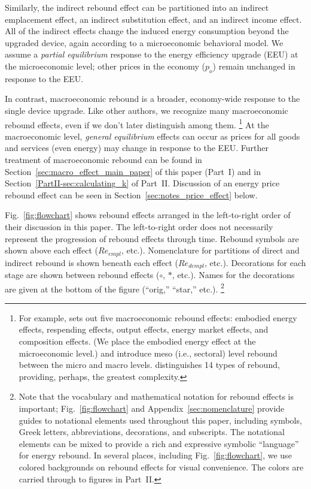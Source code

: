 \documentclass[12pt]{article}\usepackage[]{graphicx}\usepackage[]{xcolor}
\begin{document}
Similarly, the indirect rebound effect can be partitioned into
an indirect emplacement effect, 
an indirect substitution effect, and
an indirect income effect. 
All of the indirect effects
change the induced energy consumption
beyond the upgraded device, 
again according to a microeconomic behavioral model.
We assume a \emph{partial equilibrium} response to the 
energy efficiency upgrade (EEU)
at the microeconomic level;
other prices in the economy ($p_o$) remain unchanged
in response to the EEU.

In contrast, 
macroeconomic rebound is a broader, economy-wide response 
to the single device upgrade. 
Like other authors, we recognize many macroeconomic rebound effects, 
even if we don't later distinguish among them.%
\footnote{
  For example, \citet{Sorrell:2009cg} 
  sets out five macroeconomic rebound effects:
  embodied energy effects, respending effects, output effects, 
  energy market effects, and composition effects.
  (We place the embodied energy effect at the microeconomic level.)
  \citet{Santarius2016} and \citet{Lange2021} 
  introduce 
  meso (i.e., sectoral) level rebound
  between the micro and macro levels.
  \citet{VandenBergh2011} distinguishes 14 types of rebound, 
  providing, perhaps, the greatest complexity.   
}
%
At the macroeconomic level, \emph{general equilibrium} effects
can occur as prices for all goods and services (even energy)
may change in response to the EEU.
Further treatment of macroeconomic rebound
can be found 
in Section~\ref{sec:macro_effect_main_paper} of this paper (Part~I) and 
in Section~\ref{PartII-sec:calculating_k} of Part~II.
Discussion of an energy price rebound effect 
can be seen in Section~\ref{sec:notes_price_effect} below.

Fig.~\ref{fig:flowchart} shows rebound effects
arranged in the left-to-right order of their discussion in this paper.
The left-to-right order does not necessarily represent 
the progression of rebound effects through time.
Rebound symbols are shown above each effect ($Re_{empl}$, etc.).
Nomenclature for partitions of direct and indirect rebound 
is shown beneath each effect ($Re_{dempl}$, etc.).
Decorations for each stage are shown between rebound effects
($\circ$, $*$, etc.).
Names for the decorations are given at the bottom of the figure
(``orig,'' ``star,'' etc.).%
\footnote{
  Note that
  the vocabulary and mathematical notation for rebound effects is important;
  Fig.~\ref{fig:flowchart} and Appendix~\ref{sec:nomenclature} provide guides to 
  notational elements used throughout this paper, including
  symbols, Greek letters, abbreviations, decorations, and subscripts.
  The notational elements 
  can be mixed to provide a rich and expressive symbolic ``language'' for energy rebound.
  In several places, including Fig.~\ref{fig:flowchart},
  we use colored backgrounds on rebound effects for visual convenience. 
  The colors are carried through to figures in Part~II.
}
\end{document}
